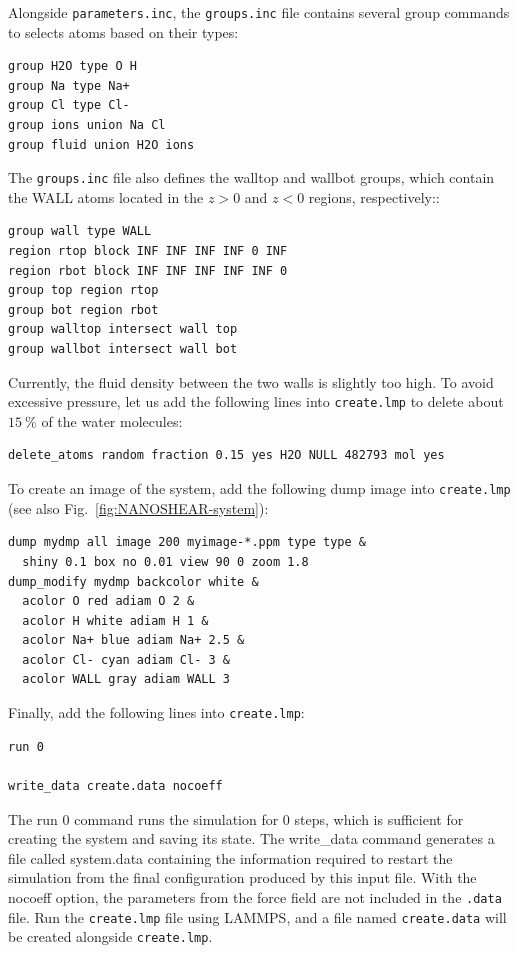 \documentclass[9pt,tutorial]{livecoms}
\newcommand{\lmpcmd}[1]{\hspace{0pt}\colorbox{listing}{\textcolor{command}{\small{#1}}}\hspace{0pt}} %
\newcommand{\flecmd}[1]{\textcolor{command}{\texttt{#1}}} %
\begin{document}
Alongside \flecmd{parameters.inc}, the \flecmd{groups.inc} file contains
several \lmpcmd{group} commands to selects atoms based on their types:
\begin{lstlisting}
group H2O type O H
group Na type Na+
group Cl type Cl-
group ions union Na Cl
group fluid union H2O ions
\end{lstlisting}
The \flecmd{groups.inc} file also defines the \lmpcmd{walltop} and \lmpcmd{wallbot}
groups, which contain the WALL atoms located in the $z > 0$ and $z < 0$ regions, respectively::
\begin{lstlisting}
group wall type WALL
region rtop block INF INF INF INF 0 INF
region rbot block INF INF INF INF INF 0
group top region rtop
group bot region rbot
group walltop intersect wall top
group wallbot intersect wall bot
\end{lstlisting}

Currently, the fluid density between the two walls is slightly too high.  To avoid
excessive pressure, let us add the following lines into \flecmd{create.lmp}
to delete about $15~\%$ of the water molecules:
\begin{lstlisting}
delete_atoms random fraction 0.15 yes H2O NULL 482793 mol yes
\end{lstlisting}

To create an image of the system, add the following \lmpcmd{dump} image
into \flecmd{create.lmp} (see also Fig.~\ref{fig:NANOSHEAR-system}):
\begin{lstlisting}
dump mydmp all image 200 myimage-*.ppm type type &
  shiny 0.1 box no 0.01 view 90 0 zoom 1.8
dump_modify mydmp backcolor white &
  acolor O red adiam O 2 &
  acolor H white adiam H 1 &
  acolor Na+ blue adiam Na+ 2.5 &
  acolor Cl- cyan adiam Cl- 3 &
  acolor WALL gray adiam WALL 3
\end{lstlisting}

Finally, add the following lines into \flecmd{create.lmp}:
\begin{lstlisting}
run 0

write_data create.data nocoeff
\end{lstlisting}
The \lmpcmd{run 0} command runs the simulation for 0 steps, which is sufficient for
creating the system and saving its state.  The \lmpcmd{write\_data} command
generates a file called \lmpcmd{system.data} containing the information required
to restart the simulation from the final configuration produced by this input
file.  With the \lmpcmd{nocoeff} option, the parameters from the force field are
not included in the \flecmd{.data} file.  Run the \flecmd{create.lmp} file using LAMMPS,
and a file named \flecmd{create.data} will be created alongside \flecmd{create.lmp}.
\end{document}
